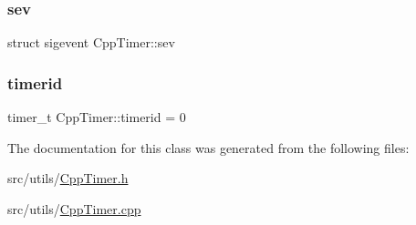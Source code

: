 \mbox{\label{classCppTimer_a9860d3d723ad55982db50c9cde8d725a}} 
\subsubsection{\texorpdfstring{sev}{sev}}
{\footnotesize\ttfamily struct sigevent Cpp\+Timer\+::sev\hspace{0.3cm}{\ttfamily [private]}}

\mbox{\label{classCppTimer_a90ff764263fdde5a0f6e53429c8cf734}} 
\subsubsection{\texorpdfstring{timerid}{timerid}}
{\footnotesize\ttfamily timer\+\_\+t Cpp\+Timer\+::timerid = 0\hspace{0.3cm}{\ttfamily [private]}}



The documentation for this class was generated from the following files\+:\begin{DoxyCompactItemize}
\item 
src/utils/\hyperlink{CppTimer_8h}{Cpp\+Timer.\+h}\item 
src/utils/\hyperlink{CppTimer_8cpp}{Cpp\+Timer.\+cpp}\end{DoxyCompactItemize}
